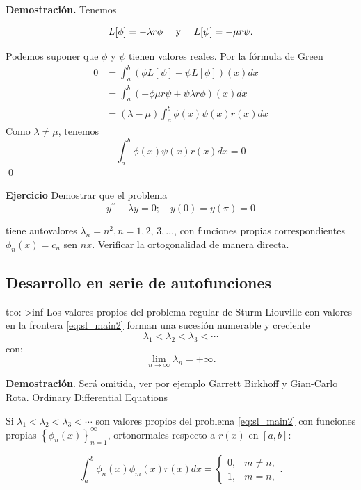 
 
\textbf{Demostración.} Tenemos

$$L[\phi]=-\lambda r \phi\quad\hbox{ y }\quad L[\psi]=-\mu r \psi.$$

Podemos suponer que $\phi$ y $\psi$ tienen valores reales. Por la fórmula de Green
$$
\begin{aligned}
0 &=\int_{a}^{b}(\phi L[\psi]-\psi L[\phi])(x) d x \\
&=\int_{a}^{b}(-\phi \mu r \psi+\psi \lambda r \phi)(x) d x \\
&=(\lambda-\mu) \int_{a}^{b} \phi(x) \psi(x) r(x) d x
\end{aligned}
$$
Como $\lambda \neq \mu$, tenemos
$$
\int_{a}^{b} \phi(x) \psi(x) r(x) d x=0
$$
\qed
 

\textbf{Ejercicio} Demostrar que el problema
$$y^{\prime \prime}+\lambda y=0 ; \quad y(0)=y(\pi)=0$$

tiene autovalores  $\lambda_{n}=n^{2}, n=1,2$, $3, \ldots$, con funciones propias correspondientes $\phi_{n}(x)=c_{n}$ sen $n x$. Verificar la ortogonalidad de manera directa.

 
 
 
 \subsection{Desarrollo en serie de autofunciones}
 
 
 

 \begin{teorema}{teo:->inf}{} Los valores propios del problema regular de Sturm-Liouville con valores en la frontera \eqref{eq:sl_main2} forman una sucesión numerable y creciente
$$\lambda_{1}<\lambda_{2}<\lambda_{3}<\cdots$$
con:
$$\lim _{n \rightarrow \infty} \lambda_{n}=+\infty.$$
\end{teorema}



\textbf{Demostración}. Será omitida, ver por ejemplo Garrett Birkhoff y Gian-Carlo Rota. Ordinary Differential Equations

 
 Si $\lambda_{1}<\lambda_{2}<\lambda_{3}<\cdots$ son valores propios del problema \eqref{eq:sl_main2} con funciones propias  $\left\{\phi_{n}(x)\right\}_{n=1}^{\infty}$,  ortonormales respecto  a $r(x)$ en $[a, b]$:

 $$\int_{a}^{b} \phi_{n}(x) \phi_{m}(x) r(x) d x= \begin{cases}0, & m \neq n, \\ 1, & m=n,\end{cases}.$$ 

